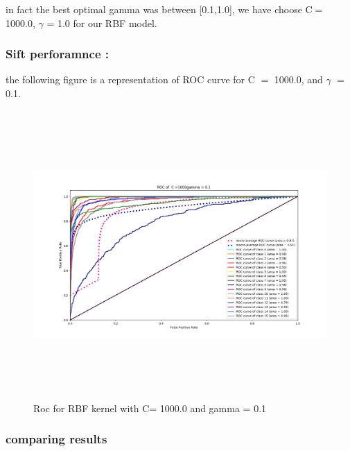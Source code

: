 in fact the best optimal gamma was between [0.1,1.0], we have choose C$=$ 1000.0, $\gamma$ = 1.0 for our RBF model.

\subsubsection{Sift perforamnce :}



the following figure is a representation of ROC curve for C $=$ 1000.0, and $\gamma$ $=$ 0.1.

\begin{figure}[H]
\centering
\includegraphics[width=16.5cm, height=11cm]{img/roc/sift_ROC_class_C1000gamma.png}
\caption{Roc for RBF kernel with C= 1000.0 and gamma = 0.1}
\label{fig:rbf2}
\end{figure}


\subsubsection{comparing results  } 

